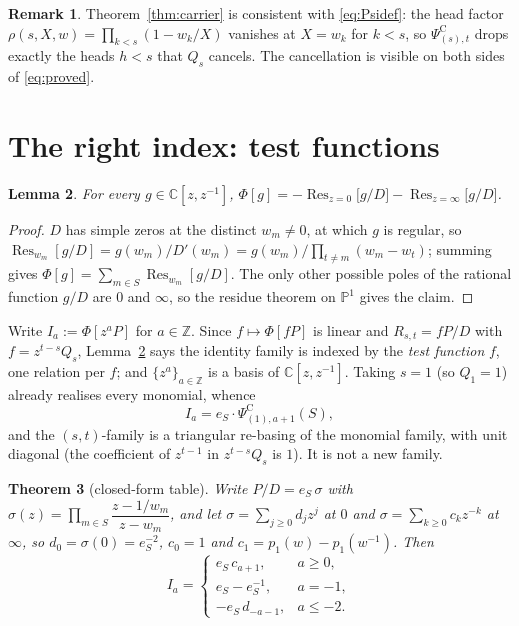 \documentclass[11pt]{article}
\newtheorem{theorem}{Theorem}
\newtheorem{lemma}[theorem]{Lemma}
\theoremstyle{definition}
\newtheorem{remark}[theorem]{Remark}
\theoremstyle{remark}
\DeclareMathOperator{\Res}{Res}
\newcommand{\PsiC}{\Psi^{\mathrm{C}}}
\begin{document}
\begin{remark}
Theorem~\ref{thm:carrier} is consistent with \eqref{eq:Psidef}: the head factor
$\rho(s,X,w)=\prod_{k<s}(1-w_k/X)$ vanishes at $X=w_k$ for $k<s$, so $\PsiC_{(s),t}$
drops exactly the heads $h<s$ that $Q_s$ cancels. The cancellation is visible on both
sides of \eqref{eq:proved}.
\end{remark}

\section{The right index: test functions}\label{sec:basis}

\begin{lemma}\label{lem:Phi}
For every $g\in\mathbb{C}[z,z^{-1}]$,
$\displaystyle \Phi[g]=-\Res_{z=0}\bigl[g/D\bigr]-\Res_{z=\infty}\bigl[g/D\bigr]$.
\end{lemma}

\begin{proof}
$D$ has simple zeros at the distinct $w_m\neq0$, at which $g$ is regular, so
$\Res_{w_m}[g/D]=g(w_m)/D'(w_m)=g(w_m)/\prod_{t\neq m}(w_m-w_t)$; summing gives
$\Phi[g]=\sum_{m\in S}\Res_{w_m}[g/D]$. The only other possible poles of the rational
function $g/D$ are $0$ and $\infty$, so the residue theorem on $\mathbb{P}^1$ gives the
claim.
\end{proof}

Write $I_a:=\Phi[z^aP]$ for $a\in\mathbb{Z}$. Since $f\mapsto\Phi[fP]$ is linear and
$R_{s,t}=fP/D$ with $f=z^{t-s}Q_s$, Lemma~\ref{lem:Phi} says the identity family is
indexed by the \emph{test function} $f$, one relation per $f$; and $\{z^a\}_{a\in\mathbb{Z}}$
is a basis of $\mathbb{C}[z,z^{-1}]$. Taking $s=1$ (so $Q_1=1$) already realises every
monomial, whence
\begin{equation}\label{eq:Ia}
  I_a=e_S\cdot\PsiC_{(1),a+1}(S),
\end{equation}
and the $(s,t)$-family is a triangular re-basing of the monomial family, with unit
diagonal (the coefficient of $z^{t-1}$ in $z^{t-s}Q_s$ is $1$). It is not a new family.

\begin{theorem}[closed-form table]\label{thm:table}
Write $P/D=e_S\,\sigma$ with $\sigma(z)=\prod_{m\in S}\dfrac{z-1/w_m}{z-w_m}$, and let
$\sigma=\sum_{j\ge0}d_jz^{j}$ at $0$ and $\sigma=\sum_{k\ge0}c_kz^{-k}$ at $\infty$, so
$d_0=\sigma(0)=e_S^{-2}$, $c_0=1$ and $c_1=p_1(w)-p_1(w^{-1})$. Then
\[
  I_a=\begin{cases}
    e_S\,c_{a+1}, & a\ge0,\\[2pt]
    e_S-e_S^{-1}, & a=-1,\\[2pt]
    -e_S\,d_{-a-1}, & a\le-2.
  \end{cases}
\]
\end{theorem}
\end{document}
